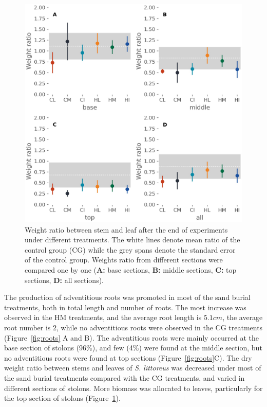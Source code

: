 \documentclass[]{interact}
\theoremstyle{plain}%
\theoremstyle{definition}
\theoremstyle{remark}
\begin{document}
\begin{figure}
  \centering
  \includegraphics[scale=0.8]{../figs/ratio.jpg}
  \caption{
    Weight ratio between stem and leaf after the end of experiments under different treatments. The white lines denote mean ratio of the control group (CG) while the grey spans denote the standard error of the control group. Weights ratio from different sections were compared one by one (\textbf{A:} base sections, \textbf{B:} middle sections, \textbf{C:} top sections, \textbf{D:} all sections).
  }
  \label{fig:ratio}
\end{figure}

The production of adventitious roots was promoted in most of the sand burial treatments, both in total length and number of roots. The most increase was observed in the HM treatments, and the average root length is $5.1cm$, the average root number is $2$, while no adventitious roots were observed in the CG treatments (Figure~\ref{fig:roots} A and B).
The adventitious roots were mainly occurred at the base section of stolons (96\%), and few (4\%) were found at the middle section, but no adventitious roots were found at top sections (Figure~\ref{fig:roots}C).
The dry weight ratio between stems and leaves of \textit{S. littoreus} was decreased under most of the sand burial treatments compared with the CG treatments, and varied in different sections of stolons. More biomass was allocated to leaves, particularly for the top section of stolons (Figure~\ref{fig:ratio}).
\end{document}
